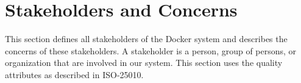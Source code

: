 
\clearpage
\chapter{Stakeholders and Concerns}
\label{ch:stakeholders}
This section defines all stakeholders of the Docker system and describes the concerns of these stakeholders. A stakeholder is a person, group of persons, or organization that are involved in our system. This section uses the quality attributes as described in ISO-25010\cite{iso25010}.






